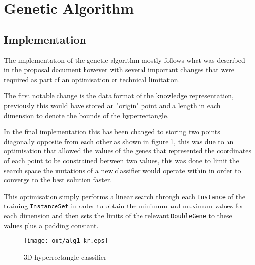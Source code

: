 \documentclass[a4paper]{article}
\title{\DOCTITLE}
\author{\DOCAUTHOR}
\date{\DOCDATE}
\begin{document}
\maketitle

\begin{abstract}
  This report will give an overview of the two nature inspired algorithms that
  were implemented to solve the classification problem, how they differ from
  what was outlined in the proposal and a critical evaluation between the
  performance of both in terms of learning time and classification accuracy.
\end{abstract}

\section{Genetic Algorithm}
\label{sec:ga}

\subsection{Implementation}
\label{sec:ga_implementation}

The implementation of the genetic algorithm mostly follows what was described in
the proposal document however with several important changes that were required
as part of an optimisation or technical limitation.

The first notable change is the data format of the knowledge representation,
previously this would have stored an "origin" point and a length in each
dimension to denote the bounds of the hyperrectangle.

In the final implementation this has been changed to storing two points
diagonally opposite from each other as shown in figure \ref{fig:ga_kr}, this was
due to an optimisation that allowed the values of the genes that represented the
coordinates of each point to be constrained between two values, this was done to
limit the search space the mutations of a new classifier would operate within in
order to converge to the best solution faster.

This optimisation simply performs a linear search through each \texttt{Instance}
of the training \texttt{InstanceSet} in order to obtain the minimum and maximum
values for each dimension and then sets the limits of the relevant
\texttt{DoubleGene} to these values plus a padding constant.

\begin{figure}[h!]
  \centering
  \texttt{[image: out/alg1\_kr.eps]}
  \caption{3D hyperrectangle classifier}
  \label{fig:ga_kr}
\end{figure}
\end{document}
